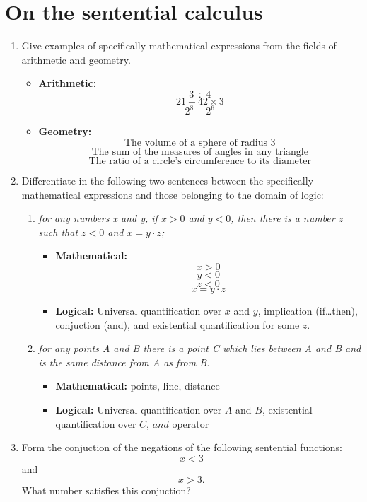 \section{On the sentential calculus}
\begin{enumerate}
\item Give examples of specifically mathematical expressions from the
  fields of arithmetic and geometry.
  \begin{itemize}
  \item \textbf{Arithmetic:}
    $$3 \div 4$$
    $$21 + 42 \times 3$$
    $$2^8 - 2^6$$
  \item \textbf{Geometry:}
    $$\text{The volume of a sphere of radius 3}$$
    $$\text{The sum of the measures of angles in any triangle}$$
    $$\text{The ratio of a circle's circumference to its diameter}$$
  \end{itemize}
\item Differentiate in the following two sentences between the
  specifically mathematical expressions and those belonging to the
  domain of logic:
  \begin{enumerate}
    \item \emph{for any numbers x and y, if $x>0$ and $y<0$, then
      there is a number z such that $z<0$ and $x=y \cdot z$;}
      \begin{itemize}
      \item \textbf{Mathematical:} $$x>0$$ $$y<0$$ $$z<0$$ $$x=y \cdot
        z$$
      \item \textbf{Logical:} Universal quantification over $x$ and
        $y$, implication (if{\ldots}then), conjuction (and), and
        existential quantification for some $z$.
      \end{itemize}
    \item \emph{for any points A and B there is a point C which lies
      between A and B and is the same distance from A as from B.}
      \begin{itemize}
      \item \textbf{Mathematical:} points, line, distance
      \item \textbf{Logical:} Universal quantification over $A$ and
        $B$, existential quantification over $C$, $and$ operator
      \end{itemize}
  \end{enumerate}
\item Form the conjuction of the negations of the following sentential
  functions:
  $$x<3$$
  and
  $$x>3.$$
  What number satisfies this conjuction?
  \begin{itemize}

\end{itemize}
\end{enumerate}
